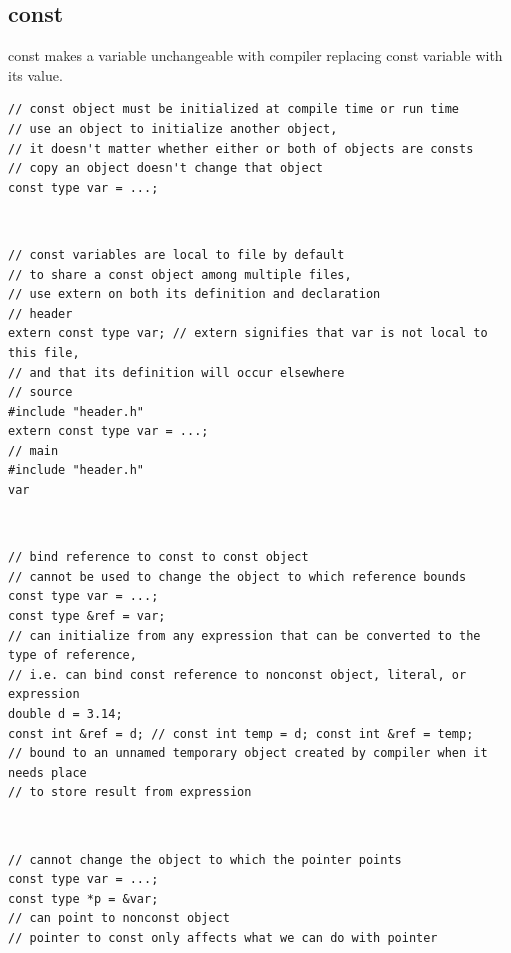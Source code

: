 \documentclass{blog}
\begin{document}
\subsection{const}
\begin{definition}[const]
    const makes a variable unchangeable with compiler replacing const variable with its value.
    \begin{verbatim}
// const object must be initialized at compile time or run time
// use an object to initialize another object,
// it doesn't matter whether either or both of objects are consts
// copy an object doesn't change that object
const type var = ...;
\end{verbatim}
\end{definition}

\begin{definition}~
    \begin{verbatim}
// const variables are local to file by default
// to share a const object among multiple files,
// use extern on both its definition and declaration
// header
extern const type var; // extern signifies that var is not local to this file,
// and that its definition will occur elsewhere
// source
#include "header.h"
extern const type var = ...;
// main
#include "header.h"
var
\end{verbatim}
\end{definition}

\begin{definition}~
    \begin{verbatim}
// bind reference to const to const object
// cannot be used to change the object to which reference bounds
const type var = ...;
const type &ref = var;
// can initialize from any expression that can be converted to the type of reference,
// i.e. can bind const reference to nonconst object, literal, or expression
double d = 3.14;
const int &ref = d; // const int temp = d; const int &ref = temp;
// bound to an unnamed temporary object created by compiler when it needs place
// to store result from expression
\end{verbatim}
\end{definition}

\begin{definition}~
    \begin{verbatim}
// cannot change the object to which the pointer points
const type var = ...;
const type *p = &var;
// can point to nonconst object
// pointer to const only affects what we can do with pointer
\end{verbatim}
\end{definition}
\end{document}
